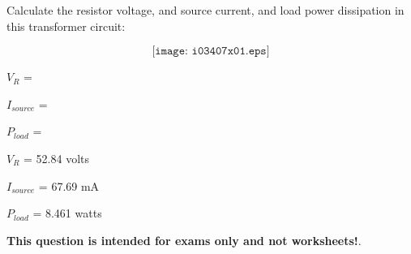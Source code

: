 

Calculate the resistor voltage, and source current, and load power dissipation in this transformer circuit:

$$\texttt{[image: i03407x01.eps]}$$

$V_R$ = 

\vskip 10pt

$I_{source}$ = 

\vskip 10pt

$P_{load}$ = 







$V_R$ = 52.84 volts

\vskip 10pt

$I_{source}$ = 67.69 mA

\vskip 10pt

$P_{load}$ = 8.461 watts







{\bf This question is intended for exams only and not worksheets!}.


